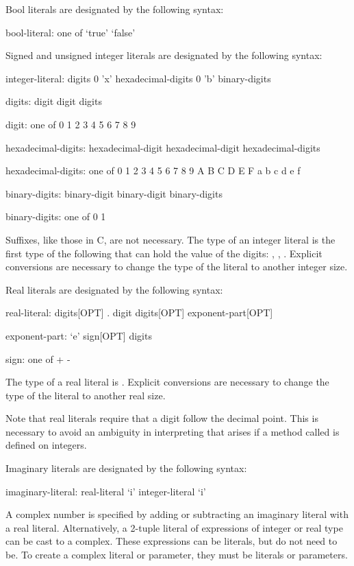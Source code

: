 Bool literals are designated by the following syntax:
\begin{syntax}
bool-literal: one of
  `true' `false'
\end{syntax}

Signed and unsigned integer literals are designated by the following
syntax:
\begin{syntax}
integer-literal:
  digits
  0 'x' hexadecimal-digits
  0 'b' binary-digits

digits:
  digit
  digit digits

digit: one of
  0 1 2 3 4 5 6 7 8 9

hexadecimal-digits:
  hexadecimal-digit
  hexadecimal-digit hexadecimal-digits

hexadecimal-digits: one of
  0 1 2 3 4 5 6 7 8 9 A B C D E F a b c d e f

binary-digits:
  binary-digit
  binary-digit binary-digits

binary-digits: one of
  0 1
\end{syntax}
Suffixes, like those in C, are not necessary.  The type of an integer
literal is the first type of the following that can hold the value of
the digits: , , .  Explicit
conversions are necessary to change the type of the literal to another
integer size.

Real literals are designated by the following syntax:
\begin{syntax}
real-literal:
  digits[OPT] . digit digits[OPT] exponent-part[OPT]

exponent-part:
  `e' sign[OPT] digits

sign: one of
  + -
\end{syntax}
The type of a real literal is .  Explicit conversions are
necessary to change the type of the literal to another real
size.

Note that real literals require that a digit follow the
decimal point.  This is necessary to avoid an ambiguity in
interpreting  that arises if a method called  is
defined on integers.

Imaginary literals are designated by the following syntax:
\begin{syntax}
imaginary-literal:
  real-literal `i'
  integer-literal `i'
\end{syntax}

A complex number is specified by adding or subtracting an imaginary
literal with a real literal.  Alternatively, a 2-tuple literal of
expressions of integer or real type can be cast to a complex.  These
expressions can be literals, but do not need to be.  To create a
complex literal or parameter, they must be literals or parameters.

